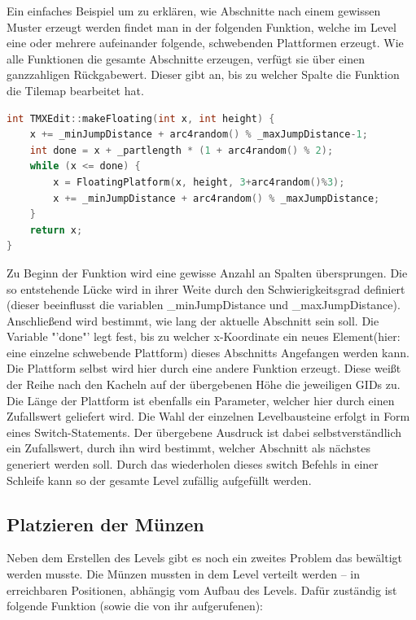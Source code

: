 Ein einfaches Beispiel um zu erklären, wie Abschnitte nach einem gewissen Muster erzeugt werden findet man in der folgenden Funktion, welche im Level eine oder mehrere aufeinander folgende, schwebenden Plattformen erzeugt. Wie alle Funktionen die gesamte Abschnitte erzeugen, verfügt sie über einen ganzzahligen Rückgabewert. Dieser gibt an, bis zu welcher Spalte die Funktion die Tilemap bearbeitet hat.
\begin{lstlisting}[label=lst:make_floating,
				   language=C++,
				   firstnumber=171,
				   caption=Abschnitt mit schwebenden Plattformen erzeugen( TMXEdit.cpp )]
int TMXEdit::makeFloating(int x, int height) {
	x += _minJumpDistance + arc4random() % _maxJumpDistance-1;
	int done = x + _partlength * (1 + arc4random() % 2);
	while (x <= done) {
		x = FloatingPlatform(x, height, 3+arc4random()%3);
		x += _minJumpDistance + arc4random() % _maxJumpDistance;
	}
	return x;
}
\end{lstlisting}
Zu Beginn der Funktion wird eine gewisse Anzahl an Spalten übersprungen. Die so entstehende Lücke wird in ihrer Weite durch den Schwierigkeitsgrad definiert (dieser beeinflusst die variablen \_minJumpDistance und \_maxJumpDistance). Anschließend wird bestimmt, wie lang der aktuelle Abschnitt sein soll. Die Variable "'done"' legt fest, bis zu welcher x-Koordinate ein neues Element(hier: eine einzelne schwebende Plattform) dieses Abschnitts Angefangen werden kann. Die Plattform selbst wird hier durch eine andere Funktion erzeugt. Diese weißt der Reihe nach den Kacheln auf der übergebenen Höhe die jeweiligen GIDs zu. Die Länge der Plattform ist ebenfalls ein Parameter, welcher hier durch einen Zufallswert geliefert wird. 
Die Wahl der einzelnen Levelbausteine erfolgt in Form eines Switch-Statements. Der übergebene Ausdruck ist dabei selbstverständlich ein Zufallswert, durch ihn wird bestimmt, welcher Abschnitt als nächstes generiert werden soll. Durch das wiederholen dieses switch Befehls in einer Schleife kann so der gesamte Level zufällig aufgefüllt werden.


\subsection{Platzieren der Münzen}
Neben dem Erstellen des Levels gibt es noch ein zweites Problem das bewältigt werden musste. Die Münzen mussten in dem Level verteilt werden – in erreichbaren Positionen, abhängig vom Aufbau des Levels.
Dafür zuständig ist folgende Funktion (sowie die von ihr aufgerufenen):

